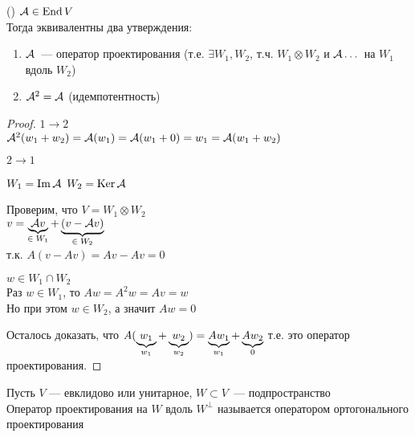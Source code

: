 \begin{theorem}()
    $\mathcal{A} \in \operatorname{End}{V}$ \\
    Тогда эквивалентны два утверждения:
    \begin{enumerate}
        \item $\mathcal{A}$~--- оператор проектирования (т.е. $\exists W_1, W_2$, т.ч. $W_1 \otimes W_2$ и $\mathcal{A} \dots $ на $W_1$ вдоль $W_2$)
        \item $\mathcal{A}^2 = \mathcal{A}$ (идемпотентность)
    \end{enumerate}
    \begin{proof}
        $1 \to 2$ \\
        $\mathcal{A}^2 (w_1 + w_2) = \mathcal{A}(w_1) = \mathcal{A}(w_1 + 0)= w_1 = \mathcal{A}(w_1 + w_2)$

        $2 \to 1$

        $W_1 = \operatorname{Im}{\mathcal{A}}$
        $W_2 = \operatorname{Ker}{\mathcal{A}}$

        Проверим, что $V = W_1 \otimes W_2$ \\
        $v = \underbrace{\mathcal{A} v }_{\text{$ \in W_1 $}} + \underbrace{(v - \mathcal{A} v)}_{\text{$ \in W_2 $}} $ \\
        т.к. $A(v - Av) = Av - A v = 0$

        $w \in W_1 \cap W_2$ \\
        Раз $w \in W_1$, то $Aw = A^2 w = Av = w$ \\
        Но при этом $w \in W_2$, а значит $Aw = 0$

        Осталось доказать, что $A(\underbrace{w_1}_{\text{$ w_1 $}}  + \underbrace{w_2}_{\text{$ w_2 $}} ) = \underbrace{A w_1}_{\text{$ w_1 $}}  + \underbrace{A w_2}_{\text{$ 0 $}}  $ т.е. это оператор проектирования.
        
    \end{proof}
\end{theorem}

\begin{conj}
    Пусть $V$ --- евклидово или унитарное, $W \subset V$~--- подпространство \\
    Оператор проектирования на $W$ вдоль $W^{\perp}$ называется оператором ортогонального проектирования
\end{conj}

